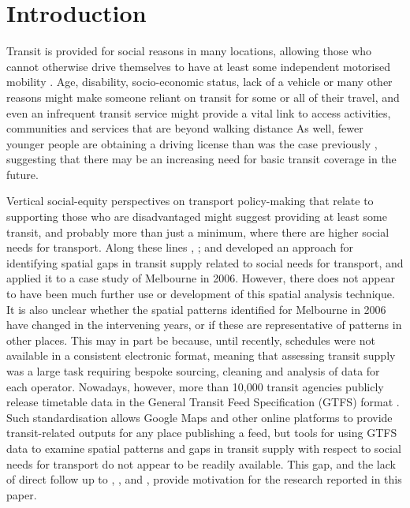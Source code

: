 \documentclass[preprint, 3p,
authoryear]{elsarticle} %
\begin{document}
\section{Introduction}\label{introduction}

Transit is provided for social reasons in many locations, allowing those
who cannot otherwise drive themselves to have at least some independent
motorised mobility \citep{Currie:2016aa}. Age, disability,
socio-economic status, lack of a vehicle or many other reasons might
make someone reliant on transit for some or all of their travel, and
even an infrequent transit service might provide a vital link to access
activities, communities and services that are beyond walking distance As
well, fewer younger people are obtaining a driving license than was the
case previously \citep{delbosc2013causes}, suggesting that there may be
an increasing need for basic transit coverage in the future.

Vertical social-equity perspectives on transport policy-making that
relate to supporting those who are disadvantaged \citep{Litman:2016aa}
might suggest providing at least some transit, and probably more than
just a minimum, where there are higher social needs for transport. Along
these lines \citet{Currie2003Hobart}, \citet{Currie2004Gap};
\citet{Currie2007Identifying} and \citet{currie2010identifying}
developed an approach for identifying spatial gaps in transit supply
related to social needs for transport, and applied it to a case study of
Melbourne in 2006. However, there does not appear to have been much
further use or development of this spatial analysis technique. It is
also unclear whether the spatial patterns identified for Melbourne in
2006 have changed in the intervening years, or if these are
representative of patterns in other places. This may in part be because,
until recently, schedules were not available in a consistent electronic
format, meaning that assessing transit supply was a large task requiring
bespoke sourcing, cleaning and analysis of data for each operator.
Nowadays, however, more than 10,000 transit agencies publicly release
timetable data in the General Transit Feed Specification (GTFS) format
\citep{GTFS}. Such standardisation allows Google Maps and other online
platforms to provide transit-related outputs for any place publishing a
feed, but tools for using GTFS data to examine spatial patterns and gaps
in transit supply with respect to social needs for transport do not
appear to be readily available. This gap, and the lack of direct follow
up to \citet{Currie2003Hobart}, \citet{Currie2004Gap},
\citet{Currie2007Identifying} and \citet{currie2010identifying}, provide
motivation for the research reported in this paper.
\end{document}
